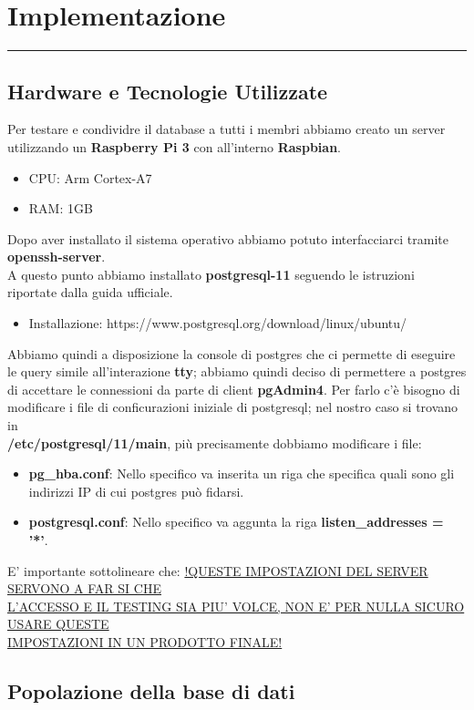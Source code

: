\documentclass[legalpaper]{article}
\begin{document}
\section{Implementazione}
\rule{\linewidth}{1.5pt}
\subsection{Hardware e Tecnologie Utilizzate}
Per testare e condividre il database a tutti i membri abbiamo creato un server utilizzando un \textbf{Raspberry Pi 3} con all'interno \textbf{Raspbian}.
\begin{itemize}
	\item CPU: Arm Cortex-A7
	\item RAM: 1GB
\end{itemize}
Dopo aver installato il sistema operativo abbiamo potuto interfacciarci tramite \textbf{openssh-server}.\\
A questo punto abbiamo installato \textbf{postgresql-11} seguendo le istruzioni riportate dalla guida ufficiale.
\begin{itemize}
	\item Installazione: https://www.postgresql.org/download/linux/ubuntu/
\end{itemize}
Abbiamo quindi a disposizione la console di postgres che ci permette di eseguire le query simile all'interazione \textbf{tty}; abbiamo quindi deciso di permettere a postgres di accettare le connessioni
da parte di client \textbf{pgAdmin4}.\newline
Per farlo c'è bisogno di modificare i file di conficurazioni iniziale di postgresql; nel nostro caso si trovano in \\ \textbf{/etc/postgresql/11/main},
più precisamente dobbiamo modificare i file:
\begin{itemize}
	\item \textbf{pg\_hba.conf}: Nello specifico va inserita un riga che specifica quali sono gli indirizzi IP di cui postgres può fidarsi.
	\item \textbf{postgresql.conf}: Nello specifico va aggunta la riga \textbf{listen\_addresses = '*'}.
\end{itemize}
E' importante sottolineare che: \underline{!QUESTE IMPOSTAZIONI DEL SERVER SERVONO A FAR SI CHE}\\ 
\underline{L'ACCESSO E IL TESTING SIA PIU' VOLCE, NON E' PER NULLA SICURO USARE QUESTE}\\
\underline{IMPOSTAZIONI IN UN PRODOTTO FINALE!}
\subsection{Popolazione della base di dati}
\end{document}

